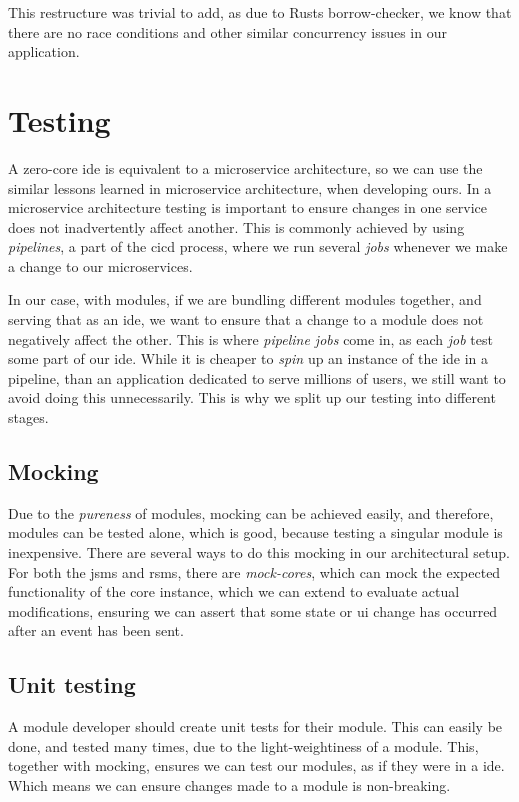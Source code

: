 This restructure was trivial to add, as due to Rusts borrow-checker, we know
that there are no race conditions and other similar concurrency issues in our
application.


\section{Testing} \label{sec:testing}

A zero-core \gls*{ide} is equivalent to a microservice architecture, so we can
use the similar lessons learned in microservice architecture, when developing
ours. In a microservice architecture testing is important to ensure changes in
one service does not inadvertently affect another. This is commonly achieved by
using \textit{pipelines}, a part of the \gls*{cicd} process, where we run
several \textit{jobs} whenever we make a change to our microservices.

In our case, with modules, if we are bundling different modules together, and
serving that as an \gls*{ide}, we want to ensure that a change to a module does
not negatively affect the other. This is where \textit{pipeline jobs} come in,
as each \textit{job} test some part of our \gls*{ide}. While it is cheaper to
\textit{spin} up an instance of the \gls*{ide} in a pipeline, than an
application dedicated to serve millions of users, we still want to avoid doing
this unnecessarily. This is why we split up our testing into different stages.


\subsection{Mocking}

Due to the \textit{pureness} of modules, mocking can be achieved easily, and
therefore, modules can be tested alone, which is good, because testing a
singular module is inexpensive. There are several ways to do this mocking in our
architectural setup. For both the \gls*{jsms} and \gls*{rsms}, there are
\textit{mock-cores}, which can mock the expected functionality of the core
instance, which we can extend to evaluate actual modifications, ensuring we can
assert that some state or \gls*{ui} change has occurred after an event has been
sent.


\subsection{Unit testing}

A module developer should create unit tests for their module. This can easily be
done, and tested many times, due to the light-weightiness of a module. This,
together with mocking, ensures we can test our modules, as if they were in a
\gls*{ide}. Which means we can ensure changes made to a module is non-breaking.

